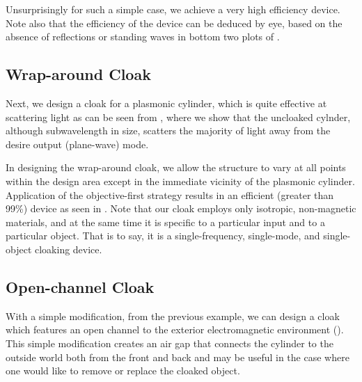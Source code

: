 Unsurprisingly for such a simple case, 
    we achieve a very high efficiency device.
Note also that the efficiency of the device can be deduced by eye,
    based on the absence of reflections or standing waves 
    in bottom two plots of .



\subsection{Wrap-around Cloak}

Next, we design a cloak for a plasmonic cylinder,
    which is quite effective at scattering light
    as can be seen from ,
    where we show that the uncloaked cylnder,
    although subwavelength in size, scatters
    the majority of light away from the desire output (plane-wave) mode.

In designing the wrap-around cloak,
    we allow the structure to vary at all points within the design area
    except in the immediate vicinity of the plasmonic cylinder.
Application of the objective-first strategy results
    in an efficient (greater than 99\%) device as seen in .
Note that our cloak employs only isotropic, non-magnetic materials,
    and at the same time it is specific to a particular input
    and to a particular object.
That is to say, it is a single-frequency, single-mode, and single-object 
    cloaking device.
    
    
    
\subsection{Open-channel Cloak}
    
With a simple modification, from the previous example,
    we can design a cloak which features an open channel
    to the exterior electromagnetic environment ().
This simple modification creates an air gap that
    connects the cylinder to the outside world
    both from the front and back and
    may be useful in the case where one would like to
    remove or replace the cloaked object.

